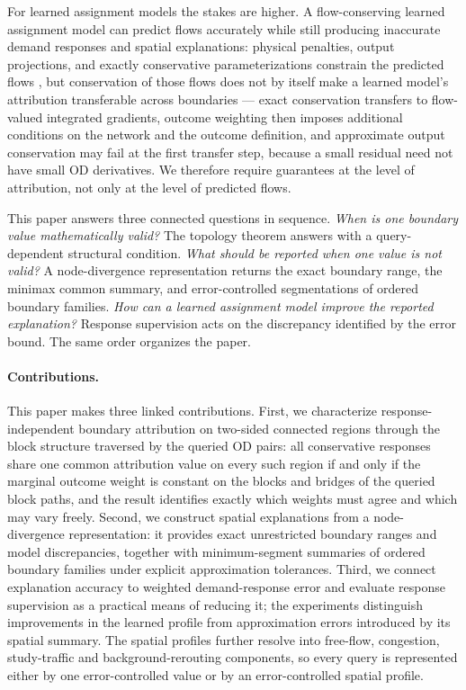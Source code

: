 \documentclass[a4paper,fleqn]{cas-sc}
\begin{document}
For learned assignment models the stakes are higher. A flow-conserving
learned assignment model can predict flows accurately while still
producing inaccurate demand responses and spatial explanations: physical
penalties, output projections, and exactly conservative parameterizations
constrain the predicted flows
\citep{raissi2019physics,shi2021physics,valente2025physics,richterpowell2022neural},
but conservation of those flows does not by itself make a learned
model's attribution transferable across boundaries --- exact
conservation transfers to flow-valued integrated gradients, outcome
weighting then imposes additional conditions on the network and the
outcome definition, and approximate output conservation may fail at
the first transfer step, because a small residual need not have small
OD derivatives. We therefore require guarantees at the level of
attribution, not only at the level of predicted flows.

This paper answers three connected questions in sequence. \emph{When is
one boundary value mathematically valid?} The topology theorem answers
with a query-dependent structural condition. \emph{What should be
reported when one value is not valid?} A node-divergence representation
returns the exact boundary range, the minimax common summary, and
error-controlled segmentations of ordered boundary families. \emph{How
can a learned assignment model improve the reported explanation?}
Response supervision acts on the discrepancy identified by the error
bound. The same order organizes the paper.

\paragraph{Contributions.}
This paper makes three linked contributions. First, we characterize
response-independent boundary attribution on two-sided connected regions
through the block structure traversed by the queried OD pairs: all
conservative responses share one common attribution value on every such
region if and only if the marginal outcome weight is constant on the
blocks and bridges of the queried block paths, and the result identifies
exactly which weights must agree and which may vary freely. Second, we
construct spatial explanations from a node-divergence representation:
it provides exact unrestricted boundary ranges and model discrepancies,
together with minimum-segment summaries of ordered boundary families
under explicit approximation tolerances. Third, we connect explanation
accuracy to weighted demand-response error and evaluate response
supervision as a practical means of reducing it; the experiments
distinguish improvements in the learned profile from approximation
errors introduced by its spatial summary. The spatial profiles further
resolve into free-flow, congestion, study-traffic and
background-rerouting components, so every query is represented either
by one error-controlled value or by an error-controlled spatial
profile.
\end{document}
